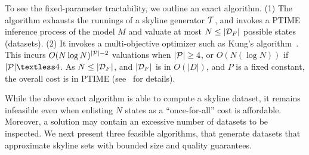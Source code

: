 \begin{proofS}
To see the fixed-parameter tractability, 
we outline an exact algorithm. 
(1) The algorithm exhausts the runnings of a skyline 
generator $\T$, and invokes a PTIME inference 
process of the model $M$ and valuate at most 
$N\leq |\D_F|$ possible states (datasets). 
(2) It invokes a multi-objective 
optimizer such as Kung's algorithm~\cite{kung1975finding}. 
This incurs $O(N\log N)^{|\P|-2}$ 
valuations when $|\P|\geq 4$, 
or $O(N(\log N))$ if $|\P|\textless 4$. 
As $N\leq |\D_F|$, and $|\D_F|$ is in $O(|D|)$, 
and $P$ is a fixed constant, 
the overall cost is in PTIME (see~\cite{full} for details). 
\end{proofS}

While the above exact algorithm is able to 
compute a skyline dataset, it remains infeasible 
even when enlisting $N$ 
states as a ``once-for-all'' 
cost is affordable. Moreover, 
a solution may contain 
an excessive number of datasets to be 
inspected. 
We next present %
three feasible algorithms, 
that %
generate datasets that approximate skyline sets with  
bounded size and quality guarantees.







